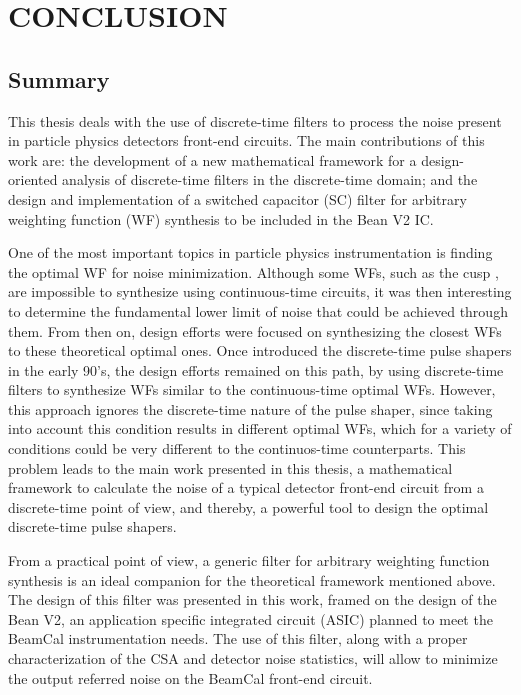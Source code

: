 \chapter{CONCLUSION}
\label{chapter:conclusion}
\section{Summary}

This thesis deals with the use of discrete-time filters to process the noise present in particle physics detectors front-end circuits. The main contributions of this work are: the development of a new mathematical framework for a design-oriented analysis of \mbox{discrete-time} filters in the \mbox{discrete-time} domain; and the design and implementation of a switched capacitor (SC) filter for arbitrary weighting function (WF) synthesis to be included in the Bean V2 IC.

One of the most important topics in particle physics instrumentation is finding the optimal WF for noise minimization. Although some WFs, such as the cusp \citep{radeka104}, are impossible to synthesize using continuous-time circuits, it was then interesting to determine the fundamental lower limit of noise that could be achieved through them. From then on, design efforts were focused on synthesizing the closest WFs to these theoretical optimal ones. Once introduced the discrete-time pulse shapers in the early 90's, the design efforts remained on this path, by using discrete-time filters to synthesize WFs similar to the continuous-time optimal WFs. However, this approach ignores the discrete-time nature of the pulse shaper, since taking into account this condition results in different optimal WFs, which for a variety of conditions could be very different to the continuos-time counterparts.  This problem leads to the main work presented in this thesis, a mathematical framework to calculate the noise of a typical detector front-end circuit from a \mbox{discrete-time} point of view, and thereby, a powerful tool to design the optimal discrete-time pulse shapers.

From a practical point of view, a generic filter for arbitrary weighting function synthesis is an ideal companion for the theoretical framework mentioned above. The design of this filter was presented in this work, framed on the design of the Bean V2,  an application specific integrated circuit (ASIC) planned to meet the BeamCal instrumentation needs. The use of this filter,  along with a proper characterization of the CSA and detector noise statistics, will allow to minimize the output referred noise on the BeamCal front-end circuit.

